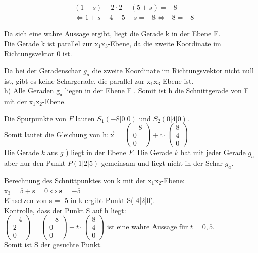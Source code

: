\documentclass[10pt]{article}
\begin{document}
$$
\begin{aligned}
& (1+s)-2 \cdot 2-(5+s)=-8 \\
& \Leftrightarrow 1+s-4-5-s=-8 \Leftrightarrow-8=-8
\end{aligned}
$$

Da sich eine wahre Aussage ergibt, liegt die Gerade k in der Ebene F.\\
Die Gerade k ist parallel zur $\mathrm{x}_{1} \mathrm{x}_{3}$-Ebene, da die zweite Koordinate im Richtungsvektor 0 ist.

Da bei der Geradenschar $g_{a}$ die zweite Koordinate im Richtungsvektor nicht null ist, gibt es keine Schargerade, die parallel zur $\mathrm{x}_{1} \mathrm{x}_{3}$-Ebene ist.\\
h) Alle Geraden $\mathrm{g}_{\mathrm{a}}$ liegen in der Ebene F . Somit ist h die Schnittgerade von F mit der $\mathrm{x}_{1} \mathrm{x}_{2}$-Ebene.

Die Spurpunkte von $F$ lauten $S_{1}(-8|0| 0)$ und $S_{2}(0|4| 0)$.\\
Somit lautet die Gleichung von $\mathrm{h}: \overrightarrow{\mathrm{x}}=\left(\begin{array}{c}-8 \\ 0 \\ 0\end{array}\right)+\mathrm{t} \cdot\left(\begin{array}{l}8 \\ 4 \\ 0\end{array}\right)$\\
Die Gerade $k$ aus $g$ ) liegt in der Ebene $F$. Die Gerade $k$ hat mit jeder Gerade $g_{a}$ aber nur den Punkt $P(1|2| 5)$ gemeinsam und liegt nicht in der Schar $g_{a}$.

Berechnung des Schnittpunktes von k mit der $\mathrm{x}_{1} \mathrm{x}_{2}$-Ebene:\\
$\mathrm{x}_{3}=5+\mathrm{s}=0 \Leftrightarrow \mathbf{s}=-5$\\
Einsetzen von s = -5 in k ergibt Punkt S(-4|2|0).\\
Kontrolle, dass der Punkt S auf h liegt:\\
$\left(\begin{array}{c}-4 \\ 2 \\ 0\end{array}\right)=\left(\begin{array}{c}-8 \\ 0 \\ 0\end{array}\right)+t \cdot\left(\begin{array}{l}8 \\ 4 \\ 0\end{array}\right)$ ist eine wahre Aussage für $t=0,5$.\\
Somit ist S der gesuchte Punkt.
\end{document}
